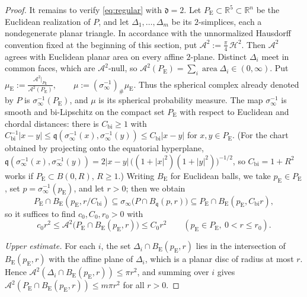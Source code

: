 \documentclass[12pt,oneside,a4paper]{article}
\theoremstyle{mytheorem}
\theoremstyle{remark}
\theoremstyle{definition}
\begin{document}
\begin{proof}
It remains to verify \eqref{eq:regular} with $\mathfrak d=2$.  Let
$P_{\mathrm E}\subset\mathbb R^5\subset\mathbb R^n$ be the Euclidean
realization of $P$, and let $\Delta_1,\dots,\Delta_m$ be its
$2$-simplices, each a nondegenerate planar triangle.  In accordance with
the unnormalized Hausdorff convention fixed at the beginning of this
section, put $\mathcal{A}^2:=\frac{\pi}{4}\,\mathcal{H}^2$.
Then $\mathcal{A}^2$ agrees with Euclidean planar area on every affine
$2$-plane.  Distinct $\Delta_i$ meet in common faces, which are
$\mathcal{A}^2$-null, so
$\mathcal{A}^2(P_{\mathrm E})
=\sum_i\operatorname{area}\Delta_i\in(0,\infty)$.
Put
$\mu_{\mathrm E}
:=\frac{\mathcal{A}^2|_{P_{\mathrm E}}}{\mathcal{A}^2(P_{\mathrm E})},\qquad
\mu:=(\sigma_\infty^{-1})_\#\mu_{\mathrm E}$.
Thus the spherical complex already denoted by $P$ is
$\sigma_\infty^{-1}(P_{\mathrm E})$, and $\mu$ is its spherical probability measure.
The map $\sigma_\infty^{-1}$ is smooth and bi-Lipschitz on the compact set
$P_{\mathrm E}$ with respect to Euclidean and chordal distances: there is
$C_{\mathrm{bi}}\ge1$ with
$C_{\mathrm{bi}}^{-1}|x-y|\le \mathfrak q(\sigma_\infty^{-1}(x),\sigma_\infty^{-1}(y))\le C_{\mathrm{bi}}|x-y|$ for
$x,y\in P_{\mathrm E}$.
(For the chart obtained by projecting onto the equatorial hyperplane,
$\mathfrak q(\sigma_\infty^{-1}(x),\sigma_\infty^{-1}(y))
 =2|x-y|\,\bigl((1+|x|^2)(1+|y|^2)\bigr)^{-1/2}$, so
$C_{\mathrm{bi}}=1+R^2$
works if $P_{\mathrm E}\subset B(0,R)$, $R\ge1$.)  Writing $B_{\mathrm E}$
for Euclidean balls, we take $p_{\mathrm E}\in P_{\mathrm E}$, set
$p=\sigma_\infty^{-1}(p_{\mathrm E})$, and let $r>0$; then we obtain
\begin{equation}\label{eq:ball-comparison}
 P_{\mathrm E}\cap B_{\mathrm E}(p_{\mathrm E},r/C_{\mathrm{bi}})
 \subseteq\sigma_\infty\bigl(P\cap B_{\mathfrak q}(p,r)\bigr)
 \subseteq P_{\mathrm E}\cap B_{\mathrm E}(p_{\mathrm E},C_{\mathrm{bi}}r),
\end{equation}
so it suffices to find $c_0,C_0,r_0>0$ with
\[
 c_0r^2\le\mathcal{A}^2\bigl(P_{\mathrm E}\cap
 B_{\mathrm E}(p_{\mathrm E},r)\bigr)\le C_0r^2
 \qquad(p_{\mathrm E}\in P_{\mathrm E},\ 0<r\le r_0).
\]

\emph{Upper estimate.}  For each $i$, the set
$\Delta_i\cap B_{\mathrm E}(p_{\mathrm E},r)$ lies in the intersection
of $B_{\mathrm E}(p_{\mathrm E},r)$ with the affine plane of
$\Delta_i$, which is a planar disc of radius at most $r$.  Hence
$\mathcal{A}^2(\Delta_i\cap B_{\mathrm E}(p_{\mathrm E},r))\le\pi r^2$,
and summing over $i$ gives
$\mathcal{A}^2(P_{\mathrm E}\cap B_{\mathrm E}(p_{\mathrm E},r))
\le m\pi r^2$ for all $r>0$.


\end{proof}
\end{document}
